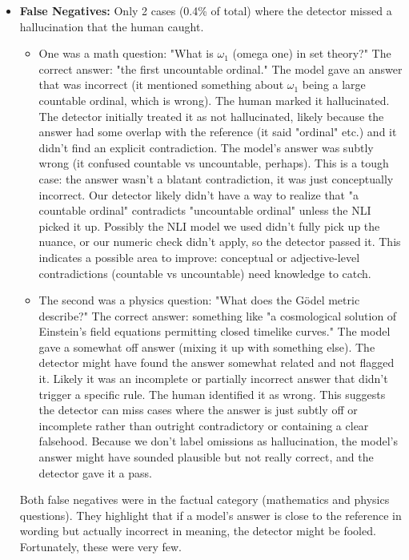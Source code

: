 \documentclass{article}
\begin{document}
\begin{itemize}
\begin{itemize}
    \end{itemize}
    In summary, the false positives were caused by either equivalent answers that weren’t recognized due to string mismatches (chemical name, instrument name), or answers phrased logically but differently (the prime number explanation) that our semantic or NLI model didn't fully grasp as correct. These are relatively subtle cases. A common theme is domain-specific knowledge (chemistry, specific term spelling) where a human easily sees the equivalence but our heuristic rules did not.
    
    \item \textbf{False Negatives:} Only 2 cases (0.4\% of total) where the detector missed a hallucination that the human caught.
    \begin{itemize}
        \item One was a math question: "What is $\omega_1$ (omega one) in set theory?" The correct answer: "the first uncountable ordinal." The model gave an answer that was incorrect (it mentioned something about $\omega_1$ being a large countable ordinal, which is wrong). The human marked it hallucinated. The detector initially treated it as not hallucinated, likely because the answer had some overlap with the reference (it said "ordinal" etc.) and it didn’t find an explicit contradiction. The model’s answer was subtly wrong (it confused countable vs uncountable, perhaps). This is a tough case: the answer wasn’t a blatant contradiction, it was just conceptually incorrect. Our detector likely didn’t have a way to realize that "a countable ordinal" contradicts "uncountable ordinal" unless the NLI picked it up. Possibly the NLI model we used didn’t fully pick up the nuance, or our numeric check didn’t apply, so the detector passed it. This indicates a possible area to improve: conceptual or adjective-level contradictions (countable vs uncountable) need knowledge to catch.
        \item The second was a physics question: "What does the Gödel metric describe?" The correct answer: something like "a cosmological solution of Einstein's field equations permitting closed timelike curves." The model gave a somewhat off answer (mixing it up with something else). The detector might have found the answer somewhat related and not flagged it. Likely it was an incomplete or partially incorrect answer that didn't trigger a specific rule. The human identified it as wrong. This suggests the detector can miss cases where the answer is just subtly off or incomplete rather than outright contradictory or containing a clear falsehood. Because we don't label omissions as hallucination, the model’s answer might have sounded plausible but not really correct, and the detector gave it a pass.
    \end{itemize}
    Both false negatives were in the factual category (mathematics and physics questions). They highlight that if a model's answer is close to the reference in wording but actually incorrect in meaning, the detector might be fooled. Fortunately, these were very few.
\end{itemize}
\end{document}
